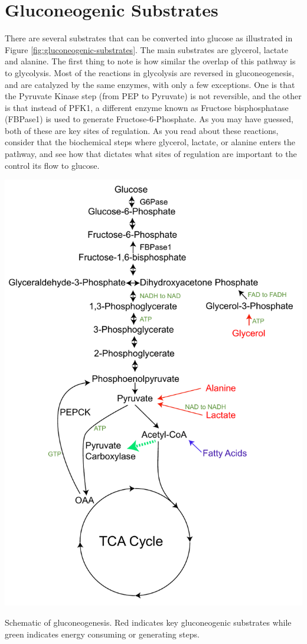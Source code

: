 \documentclass{tufte-handout}
\begin{document}
\section{Gluconeogenic Substrates}

There are several substrates that can be converted into glucose as illustrated in Figure \ref{fig:gluconeogenic-substrates}.  The main substrates are glycerol, lactate and alanine.  The first thing to note is how similar the overlap of this pathway is to glycolysis.  Most of the reactions in glycolysis are reversed in gluconeogenesis, and are catalyzed by the same enzymes, with only a few exceptions.  One is that the Pyruvate Kinase step (from PEP to Pyruvate) is not reversible, and the other is that instead of PFK1, a different enzyme known as Fructose bisphosphatase (FBPase1) is used to generate Fructose-6-Phosphate.  As you may have guessed, both of these are key sites of regulation.  As you read about these reactions, consider that the biochemical steps where glycerol, lactate, or alanine enters the pathway, and see how that dictates what sites of regulation are important to the control its flow to glucose.  

\begin{marginfigure}
\includegraphics{figures/gluconeogenic-substrates.pdf}
\caption{Schematic of gluconeogenesis.  Red indicates key gluconeogenic substrates while green indicates energy consuming or generating steps.}
\label{fig:gluconeogenic-substrates}
\end{marginfigure}
\end{document}
